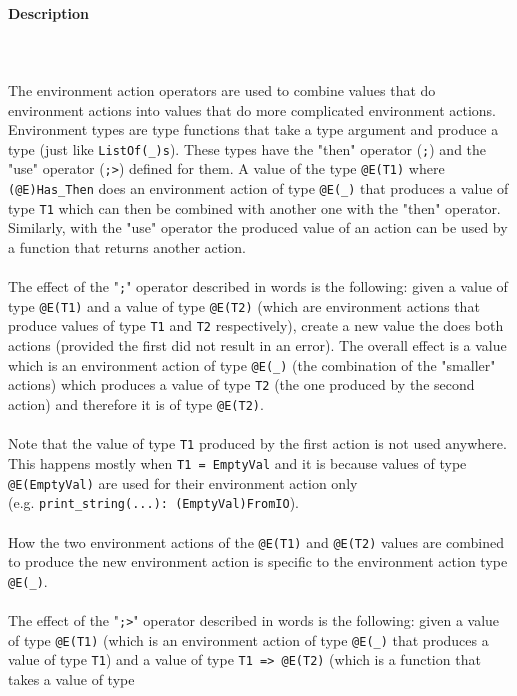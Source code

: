 \documentclass[diploma]{softlab-thesis}
\def\pend{\mbox{}\\\\}
\begin{document}
\newpage
\paragraph{Description}\pend
The environment action operators are used to combine values that do environment
actions into values that do more complicated environment actions. Environment
types are type functions that take a type argument and produce a type
(just like \verb|ListOf(_)s|). These types have the "then" operator
(\verb|;|) and the "use" operator (\verb|;>|) defined for them.  A value of the
type \verb|@E(T1)| where \verb|(@E)Has_Then| does an environment action of type
\verb|@E(_)| that produces a value of type \verb|T1| which can then be combined
with another one with the "then" operator. Similarly, with the "use" operator
the produced value of an action can be used by a function that returns another
action.
\\\\
The effect of the "\verb|;|" operator described in words is the following:
given a value of type \verb|@E(T1)| and a value of type \verb|@E(T2)|
(which are environment actions that produce values of type \verb|T1| and
\verb|T2| respectively), create a new value the does both actions (provided
the first did not result in an error).  The overall effect is a value which is
an environment action of type \verb|@E(_)| (the combination of the "smaller"
actions) which produces a value of type \verb|T2| (the one produced by the
second action) and therefore it is of type \verb|@E(T2)|.
\\\\
Note that the value of type \verb|T1| produced by the first action is not
used anywhere. This happens mostly when \verb|T1 = EmptyVal| and it is
because values of type \verb|@E(EmptyVal)| are used for their environment
action only \\(e.g. \verb|print_string(...): (EmptyVal)FromIO|).
\\\\
How the two environment actions of the \verb|@E(T1)| and \verb|@E(T2)|
values are combined to produce the new environment action is specific to the
environment action type \verb|@E(_)|.
\\\\
The effect of the "\verb|;>|" operator described in words is the following:
given a value of type \verb|@E(T1)| (which is an environment action of type
\verb|@E(_)| that produces a value of type \verb|T1|) and a value of type
\verb|T1 => @E(T2)| (which is a function that takes a value of type
\end{document}
